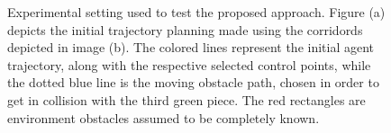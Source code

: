 \begin{figure}[!t]
\begin{center}
\begin{minipage}{.45\linewidth}
		\end{minipage}
	\end{center}
	\caption{Experimental setting used to test the proposed approach. Figure (a) depicts the initial trajectory planning made using the
    corridords depicted in image (b). The colored lines represent the initial agent trajectory, along with the respective selected control points,
    while the dotted blue line is the moving obstacle path, chosen in order to get in collision with the third green piece. The red 
    rectangles are environment obstacles assumed to be completely known.}%
    \label{FIG:ST-BEZIER-2D-SETTING}
\end{figure}
\begin{figure}[!t]
	\begin{center}
		\begin{minipage}{.45\linewidth}
			\centering
		\end{minipage}
		\begin{minipage}{.45\linewidth}
			\centering
			\subfloat[]{%
				\label{FIG:ST-BEZIER-2D-INITIAL-B}%
}
\end{minipage}
\end{center}
\end{figure}
